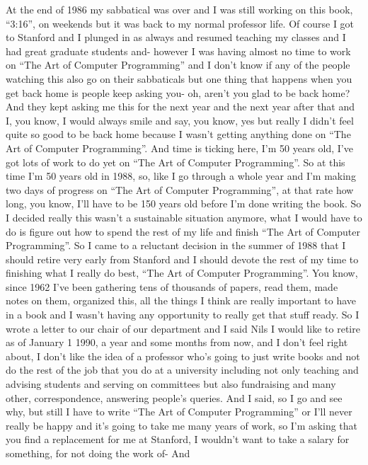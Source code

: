 \documentclass[]{article}
\begin{document}
At the end of 1986 my sabbatical was over and I was still working on
this book, ``3:16'', on weekends but it was back to my normal professor
life. Of course I got to Stanford and I plunged in as always and resumed
teaching my classes and I had great graduate students and- however I was
having almost no time to work on ``The Art of Computer Programming'' and
I don't know if any of the people watching this also go on their
sabbaticals but one thing that happens when you get back home is people
keep asking you- oh, aren't you glad to be back home? And they kept
asking me this for the next year and the next year after that and I, you
know, I would always smile and say, you know, yes but really I didn't
feel quite so good to be back home because I wasn't getting anything
done on ``The Art of Computer Programming''. And time is ticking here,
I'm 50 years old, I've got lots of work to do yet on ``The Art of
Computer Programming''. So at this time I'm 50 years old in 1988, so,
like I go through a whole year and I'm making two days of progress on
``The Art of Computer Programming'', at that rate how long, you know,
I'll have to be 150 years old before I'm done writing the book. So I
decided really this wasn't a sustainable situation anymore, what I would
have to do is figure out how to spend the rest of my life and finish
``The Art of Computer Programming''. So I came to a reluctant decision
in the summer of 1988 that I should retire very early from Stanford and
I should devote the rest of my time to finishing what I really do best,
``The Art of Computer Programming''. You know, since 1962 I've been
gathering tens of thousands of papers, read them, made notes on them,
organized this, all the things I think are really important to have in a
book and I wasn't having any opportunity to really get that stuff ready.
So I wrote a letter to our chair of our department and I said Nils I
would like to retire as of January 1 1990, a year and some months from
now, and I don't feel right about, I don't like the idea of a professor
who's going to just write books and not do the rest of the job that you
do at a university including not only teaching and advising students and
serving on committees but also fundraising and many other,
correspondence, answering people's queries. And I said, so I go and see
why, but still I have to write ``The Art of Computer Programming'' or
I'll never really be happy and it's going to take me many years of work,
so I'm asking that you find a replacement for me at Stanford, I wouldn't
want to take a salary for something, for not doing the work of- And
\end{document}
